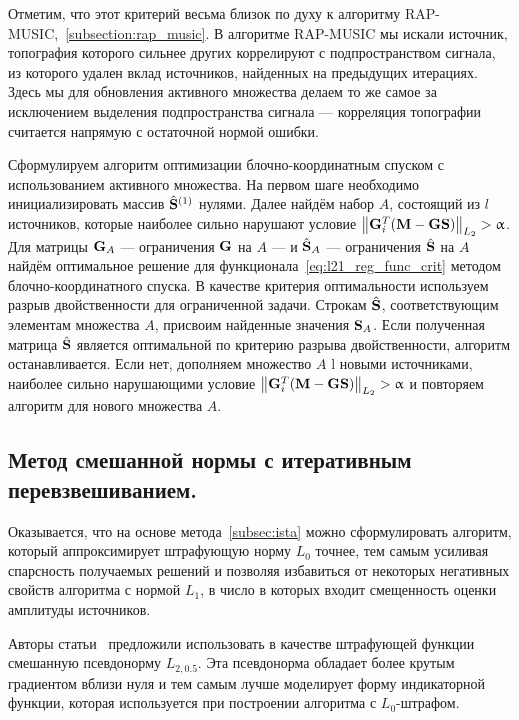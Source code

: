 Отметим, что этот критерий весьма близок по духу к алгоритму RAP-MUSIC,~\ref{subsection:rap_music}.
В алгоритме RAP-MUSIC мы искали источник, топография которого сильнее других коррелируют с подпространством сигнала,
из которого удален вклад источников, найденных на предыдущих итерациях. Здесь мы для обновления
активного множества делаем то же самое за исключением выделения подпространства сигнала ---
корреляция топографии считается напрямую с остаточной нормой ошибки.

Сформулируем алгоритм оптимизации блочно-координатным спуском с использованием
активного множества.
На первом шаге необходимо инициализировать массив
$\hat{\mathbf{S}}^{(1)}$ нулями. Далее найдём набор $A$, состоящий из $l$
источников, которые наиболее сильно нарушают условие
$\left\lVert\mathbf{G}_i^T(\mathbf{M} - \mathbf{G}\mathbf{S})\right\rVert_{L_2} > \upalpha$.
Для матрицы
$\mathbf{G}_{A}$ --- ограничения $\mathbf{G}$ на $A$ --- и $\hat{\mathbf{S}}_{A}$ --- ограничения
$\hat{\mathbf{S}}$ на $A$ найдём оптимальное решение для функционала~\ref{eq:l21_reg_func_crit}
методом блочно-координатного спуска. В качестве критерия оптимальности используем
разрыв двойственности для ограниченной задачи. Строкам $\hat{\mathbf{S}}$, соответствующим
элементам множества $A$, присвоим найденные значения $\mathbf{S}_A$. Если
полученная матрица $\hat{\mathbf{S}}$ является оптимальной по критерию разрыва двойственности,
алгоритм останавливается. Если нет, дополняем множество $A$ l новыми источниками,
наиболее сильно нарушающими условие 
$\left\lVert\mathbf{G}_i^T(\mathbf{M} - \mathbf{G}\mathbf{S})\right\rVert_{L_2} > \upalpha$ и повторяем алгоритм для
нового множества $A$.

\subsection{Метод смешанной нормы с итеративным перевзвешиванием.}
Оказывается, что на основе метода~\ref{subsec:ista}
можно сформулировать алгоритм, который аппроксимирует штрафующую норму $L_0$ точнее,
тем самым усиливая спарсность получаемых решений и позволяя избавиться
от некоторых негативных свойств алгоритма с нормой $L_{1}$, в число в которых
входит смещенность оценки амплитуды источников.

Авторы статьи~\cite{Gramfort2014} предложили использовать в качестве штрафующей
функции смешанную псевдонорму $L_{2, 0.5}$. Эта псевдонорма обладает более
крутым градиентом вблизи нуля и тем самым лучше моделирует форму индикаторной функции,
которая используется при построении алгоритма с $L_0$-штрафом.

